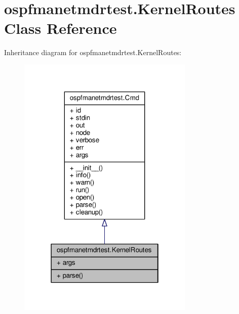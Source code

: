 \hypertarget{classospfmanetmdrtest_1_1_kernel_routes}{\section{ospfmanetmdrtest.\+Kernel\+Routes Class Reference}
\label{classospfmanetmdrtest_1_1_kernel_routes}
}


Inheritance diagram for ospfmanetmdrtest.\+Kernel\+Routes\+:
\nopagebreak
\begin{figure}[H]
\begin{center}
\leavevmode
\includegraphics[width=238pt]{classospfmanetmdrtest_1_1_kernel_routes__inherit__graph}
\end{center}
\end{figure}


